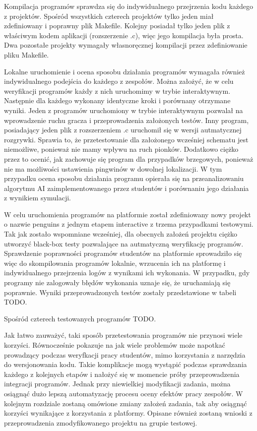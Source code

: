 Kompilacja programów sprawdza się do indywidualnego przejrzenia kodu każdego z projektów.
Spośród wszystkich czterech projektów tylko jeden miał zdefiniowany i poprawny plik Makefile.
Kolejny posiadał tylko jeden plik z właściwym kodem aplikacji (rozszerzenie .c), więc jego kompilacja była prosta.
Dwa pozostałe projekty wymagały własnoręcznej kompilacji przez zdefiniowanie pliku Makefile.

Lokalne uruchomienie i ocena sposobu działania programów wymagała również indywidualnego podejścia do każdego z zespołów.
Można założyć, że w celu weryfikacji programów każdy z nich uruchomimy w trybie interaktywnym.
Następnie dla każdego wykonany identyczne kroki i porównany otrzymane wyniki.
Jeden z programów uruchomiony w trybie interaktywnym pozwalał na wprowadzenie ruchu gracza i przeprowadzenia założonych testów.
Inny program, posiadający jeden plik z rozszerzeniem .c uruchomił się w wersji autmatycznej rozgrywki.
Sprawia to, że przetestowanie dla założonego wcześniej schematu jest niemożliwe, ponieważ nie mamy wpływu na ruch pionków.
Dodatkowo ciężko przez to ocenić, jak zachowuje się program dla przypadków brzegowych, ponieważ nie ma możliwości ustawienia pingwinów w dowolnej lokalizacji.
W tym przypadku ocena sposobu działania programu opierała się na przeanalizowaniu algorytmu AI zaimplementowanego przez studentów i porównaniu jego działania z wynikiem symulacji.

W celu uruchomienia programów na platformie został zdefiniowany nowy projekt o nazwie penguins z jednym etapem interactive z trzema przypadkami testowymi.
Tak jak zostało wspomniane wcześniej, dla obecnych założeń projektu ciężko utworzyć black-box testy pozwalające na autmatyczną weryfikację programów.
Sprawdzenie poprawności programów studentów na platformie sprowadziło się więc do skompilowania programów lokalnie, wrzucenia ich na platformę i indywidualnego przejrzenia logów z wynikami ich wykonania.
W przypadku, gdy programy nie zalogowały błędów wykonania uznaje się, że uruchamiają się poprawnie.
Wyniki przeprowadzonych testów zostały przedstawione w tabeli TODO.

Spośród czterech testowanych programów TODO.

Jak łatwo zauważyć, taki sposób przetestowania programów nie przynosi wiele korzyści.
Równocześnie pokazuje na jak wiele problemów może napotkać prowadzący podczas weryfkacji pracy studentów, mimo korzystania z narzędzia do wersjonowania kodu.
Takie komplikacje mogą wystąpić podczas sprawdzania każdego z kolejnych etapów i nałożyć się w momencie próby przeprowadzenia integracji programów.
Jednak przy niewielkiej modyfikacji zadania, można osiągnąć dużo lepszą automatyzację procesu oceny efektów pracy zespołów.
W kolejnym rozdziale zostaną omówione zmiany założeń zadania, tak aby osiągnąć korzyści wynikające z korzystania z platformy.
Opisane również zostaną wnioski z przeprowadzenia zmodyfikowanego projektu na grupie testowej.

